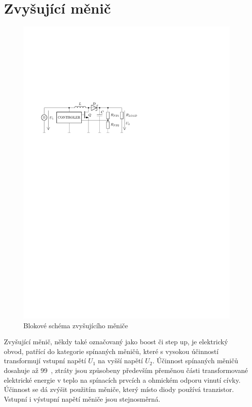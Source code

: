 \section{Zvyšující měnič}
\begin{figure}[H]
    \begin{center}
        \includegraphics[width=\textwidth]{img/boost}
    \end{center}
    \caption{Blokové schéma zvyšujícího měniče}
\end{figure}
Zvyšující měnič, někdy také označovaný jako boost či step up, je elektrický obvod, patřící do kategorie spínaných měničů, které s vysokou účinností transformují vstupní napětí $U_1$ na vyšší napětí $U_2$. Účinnost spínaných měničů dosahuje až 99~\jedn{\%}, ztráty jsou způsobeny především přeměnou části transformované elektrické energie v teplo na spínacích prvcích a ohmickém odporu vinutí cívky. Účinnost se dá zvýšit použitím měniče, který místo diody používá tranzistor. Vstupní i výstupní napětí měniče jsou stejnosměrná.

